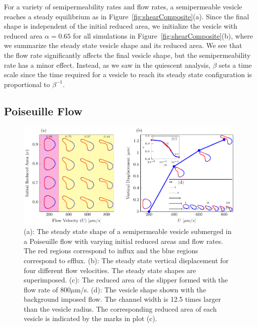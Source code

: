 \documentclass[9pt,twocolumn,twoside,lineno]{pnas-new}
\newif\ifTikz
\begin{document}
For a variety of semipermeability rates and flow rates, a semipermeable
vesicle reaches a steady equilibrium as in
Figure~\ref{fig:shearComposite}(a). Since the final shape is independent
of the initial reduced area, we initialize the vesicle with reduced area
$\alpha = 0.65$ for all simulations in
Figure~\ref{fig:shearComposite}(b), where we summarize the steady state
vesicle shape and its reduced area. We see that the flow rate
significantly affects the final vesicle shape, but the semipermeability
rate has a minor effect. Instead, as we saw in the quiescent analysis,
$\beta$ sets a time scale since the time required for a vesicle to reach
its steady state configuration is proportional to $\beta^{-1}$.

\subsection*{Poiseuille Flow}
\begin{figure}[htp]
  \ifTikz
  \centering
  
  \else
  \includegraphics{figures/parabolicComposite.pdf}
  \fi
  \caption{\label{fig:parabolicComposite} (a): The steady state shape of
  a semipermeable vesicle submerged in a Poiseuille flow with varying
  initial reduced areas and flow rates. The red regions correspond to
  influx and the blue regions correspond to efflux. (b): The steady
  state vertical displacement for four different flow velocities. The
  steady state shapes are superimposed. (c): The reduced area of the
  slipper formed with the flow rate of $800 \mu$m/s. (d): The vesicle
  shape shown with the background imposed flow. The channel width is
  12.5 times larger than the vesicle radius. The corresponding reduced
  area of each vesicle is indicated by the marks in plot (c).}
\end{figure}
\end{document}
